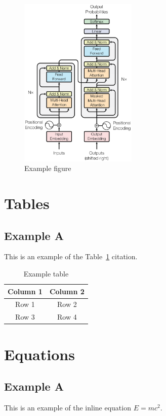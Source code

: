 \documentclass{NEXT-SCNUThesis}
\begin{document}
    \begin{figure}[htbp]
        \centering
        \includegraphics[width=0.5\textwidth]{fig/transformer.eps}
        \caption{Example figure}
        \label{fig:example-figure}
    \end{figure}

    \section{Tables}
    \subsection{Example A}
    This is an example of the Table~\ref{tab:example-table} citation.
    \begin{table}[htbp]
        \centering
        \caption{Example table}
        \label{tab:example-table}
        \begin{tabular}{|c|c|}
            \toprule Column 1 & Column 2 \\
            \midrule Row 1    & Row 2    \\
            Row 3             & Row 4    \\
            \bottomrule
        \end{tabular}
    \end{table}

    \section{Equations}
    \subsection{Example A}
    This is an example of the inline equation $E=mc^{2}$.
\end{document}

